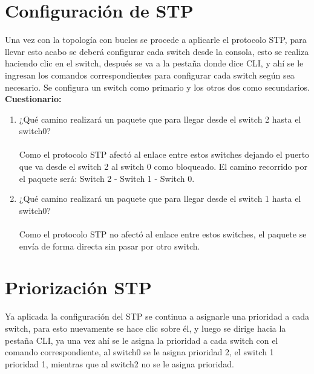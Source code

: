 \documentclass{udpreport}
\begin{document}
	\section{Configuración de STP}
	Una vez con la topología con bucles se procede a aplicarle el protocolo STP, para llevar esto acabo se deberá configurar cada
	switch desde la consola, esto se realiza haciendo clic en el switch, después se va a la pestaña donde dice CLI, y ahí se le
	ingresan los comandos correspondientes para configurar cada switch según sea necesario. Se configura un switch como
	primario y los otros dos como secundarios.\\
	{\large \bf{Cuestionario: }}\\
	\begin{enumerate}
	    \item ¿Qué camino realizará un paquete que para llegar desde el switch
2 hasta el switch0?\\\\
        Como el protocolo STP afectó al enlace entre estos switches dejando el puerto que va desde el switch 2 al switch 0 como
        bloqueado. El camino recorrido por el paquete será: Switch 2 - Switch 1 - Switch 0. 
        \item  ¿Qué camino realizará un paquete que para llegar desde el switch
1 hasta el switch0?\\\\
          Como el protocolo STP no afectó al enlace entre estos switches, el paquete se envía de forma directa sin pasar por otro
          switch.
	\end{enumerate}
	\section{Priorización STP}
	Ya aplicada la configuración del STP se continua a asignarle una prioridad a cada switch,  para esto nuevamente se hace clic
	sobre él, y luego se dirige hacia la pestaña CLI, ya una vez ahí se le asigna la prioridad a cada switch con el comando
	correspondiente, al switch0 se le asigna prioridad 2, el switch 1 prioridad 1, mientras que al switch2 no se le asigna
	prioridad.\\
\end{document}
